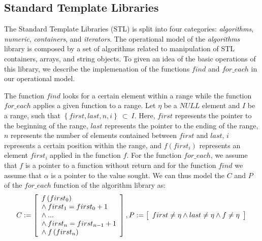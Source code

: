 \documentclass[a4paper]{llncs}
\begin{document}
\subsection{Standard Template Libraries}

The Standard Template Libraries (STL) is split into
four categories: \textit{algorithms}, \textit{numeric},
\textit{containers}, and \textit{iterators}. The operational model
of the \textit{algorithms} library is composed by a set of algorithms
related to manipulation of STL containers, arrays, and string objects.
To given an idea of the basic operations of this library, we describe
the implemenation of the functions $find$ and $for\_each$ in our
operational model.

The function $find$ looks for a certain element within a range while the
function $for\_each$ applies a given function to a range. Let $\eta$ be
a $NULL$ element and $I$ be a range, such that $\left\{first, last, n, i\right\}\:\subset\:I$.
Here, $first$ represents the pointer to the beginning of the range, $last$ represents
the pointer to the ending of the range, $n$ represents the number of elements
contained between $first$ and $last$, $i$ represents a certain position
within the range, and $f\left(first_{i}\right)$ represents an element $first_{i}$ applied in the function $f$. For the function $for\_each$, we assume that $f$ is a pointer
to a function without return and for the function $find$ we assume that $\alpha$ is a pointer to the value sought.
We can thus model the $C$ and $P$ of the $for\_each$ function  of the algorithm library as:
%
\begin{equation}
\label{quantifier-free-formulae-for-each}
C := \left [ \begin{array}{ll}
            f\left(first_{0}\right) \\
            \wedge \:first_{1} = first_{0} +1 \\
            \wedge \:... \\
            \wedge \:first_{n} = first_{n-1} +1 \\
            \wedge \:f\left(first_{n}\right) \\
              \end{array} \right ], \\
P := \left [ \begin{array}{ll}
            first \neq \eta \wedge last \neq \eta \wedge f \neq \eta \\
              \end{array} \right ]  \\
\end{equation}
%
\end{document}
